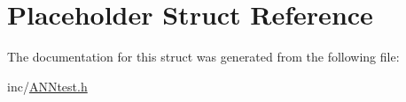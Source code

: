 \hypertarget{structPlaceholder}{\section{Placeholder Struct Reference}
\label{structPlaceholder}
}


The documentation for this struct was generated from the following file\-:\begin{DoxyCompactItemize}
\item 
inc/\hyperlink{ANNtest_8h}{A\-N\-Ntest.\-h}\end{DoxyCompactItemize}

